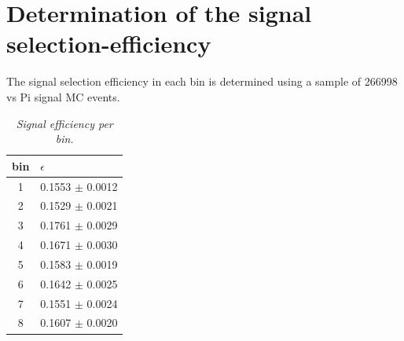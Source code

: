 \section{Determination of the signal selection-efficiency}
The signal selection efficiency in each bin is determined using a sample of 266998 \KsPiPi vs \4Pi signal MC events.\\
\begin{table}[!h]
	\begin{center}
		\begin{tabular}{c| l }
			bin & $\epsilon$  \\
			\hline
1 & 0.1553 $\pm$ 0.0012 \\ 
2 & 0.1529 $\pm$ 0.0021 \\ 
3 & 0.1761 $\pm$ 0.0029 \\ 
4 & 0.1671 $\pm$ 0.0030 \\ 
5 & 0.1583 $\pm$ 0.0019 \\ 
6 & 0.1642 $\pm$ 0.0025 \\ 
7 & 0.1551 $\pm$ 0.0024 \\ 
8 & 0.1607 $\pm$ 0.0020 \\
			\end{tabular}
	\end{center}
	\vspace*{-0.5cm}
	\caption{\textit{Signal efficiency per bin.}}
\end{table}

\clearpage
